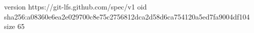 version https://git-lfs.github.com/spec/v1
oid sha256:a08360e6ea2e029700c8e75c2756812dca2d58d6ca754120a5ed7fa9004df104
size 65
